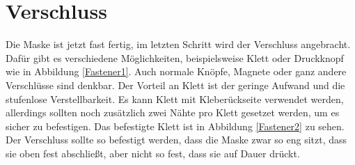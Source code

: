 \documentclass[12pt,parskip=full]{scrartcl}
\begin{document}
\clearpage
\section{Verschluss}
Die Maske ist jetzt fast fertig, im letzten Schritt wird der Verschluss angebracht. Dafür gibt es verschiedene Möglichkeiten, beispielsweise Klett oder Druckknopf wie in Abbildung \ref{Fastener1}. Auch normale Knöpfe, Magnete oder ganz andere Verschlüsse sind denkbar. Der Vorteil an Klett ist der geringe Aufwand und die stufenlose Verstellbarkeit. Es kann Klett mit Kleberückseite verwendet werden, allerdings sollten noch zusätzlich zwei Nähte pro Klett gesetzet werden, um es sicher zu befestigen. Das befestigte Klett ist in Abbildung \ref{Fastener2} zu sehen. Der Verschluss sollte so befestigt werden, dass die Maske zwar so eng sitzt, dass sie oben fest abschließt, aber nicht so fest, dass sie auf Dauer drückt.
\end{document}
